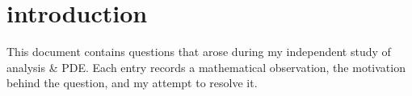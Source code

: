 \documentclass{article}
\begin{document}
\tableofcontents

\section{introduction}
This document contains questions that arose during my independent study of analysis & PDE. Each entry records a mathematical observation, the motivation behind the question, and my attempt to resolve it.


\end{document}
